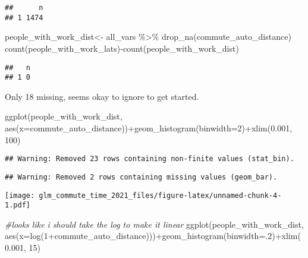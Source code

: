 \documentclass[
]{article}
\newenvironment{Shaded}{\begin{snugshade}}{\end{snugshade}}
\newcommand{\AttributeTok}[1]{\textcolor[rgb]{0.77,0.63,0.00}{#1}}
\newcommand{\CommentTok}[1]{\textcolor[rgb]{0.56,0.35,0.01}{\textit{#1}}}
\newcommand{\DecValTok}[1]{\textcolor[rgb]{0.00,0.00,0.81}{#1}}
\newcommand{\FloatTok}[1]{\textcolor[rgb]{0.00,0.00,0.81}{#1}}
\newcommand{\FunctionTok}[1]{\textcolor[rgb]{0.00,0.00,0.00}{#1}}
\newcommand{\NormalTok}[1]{#1}
\newcommand{\OtherTok}[1]{\textcolor[rgb]{0.56,0.35,0.01}{#1}}
\newcommand{\SpecialCharTok}[1]{\textcolor[rgb]{0.00,0.00,0.00}{#1}}
\begin{document}
\begin{verbatim}
##      n
## 1 1474
\end{verbatim}

\begin{Shaded}
\begin{Highlighting}[]
\NormalTok{people\_with\_work\_dist}\OtherTok{\textless{}{-}}\NormalTok{ all\_vars }\SpecialCharTok{\%\textgreater{}\%} \FunctionTok{drop\_na}\NormalTok{(commute\_auto\_distance)}
\FunctionTok{count}\NormalTok{(people\_with\_work\_lats)}\SpecialCharTok{{-}}\FunctionTok{count}\NormalTok{(people\_with\_work\_dist)}
\end{Highlighting}
\end{Shaded}

\begin{verbatim}
##   n
## 1 0
\end{verbatim}

Only 18 missing, seems okay to ignore to get started.

\begin{Shaded}
\begin{Highlighting}[]
\FunctionTok{ggplot}\NormalTok{(people\_with\_work\_dist, }\FunctionTok{aes}\NormalTok{(}\AttributeTok{x=}\NormalTok{commute\_auto\_distance))}\SpecialCharTok{+}\FunctionTok{geom\_histogram}\NormalTok{(}\AttributeTok{binwidth=}\DecValTok{2}\NormalTok{)}\SpecialCharTok{+}\FunctionTok{xlim}\NormalTok{(}\FloatTok{0.001}\NormalTok{, }\DecValTok{100}\NormalTok{)}
\end{Highlighting}
\end{Shaded}

\begin{verbatim}
## Warning: Removed 23 rows containing non-finite values (stat_bin).
\end{verbatim}

\begin{verbatim}
## Warning: Removed 2 rows containing missing values (geom_bar).
\end{verbatim}

\texttt{[image: glm\_commute\_time\_2021\_files/figure-latex/unnamed-chunk-4-1.pdf]}

\begin{Shaded}
\begin{Highlighting}[]
\CommentTok{\#looks like i should take the log to make it linear}
\FunctionTok{ggplot}\NormalTok{(people\_with\_work\_dist, }\FunctionTok{aes}\NormalTok{(}\AttributeTok{x=}\FunctionTok{log}\NormalTok{(}\DecValTok{1}\SpecialCharTok{+}\NormalTok{commute\_auto\_distance)))}\SpecialCharTok{+}\FunctionTok{geom\_histogram}\NormalTok{(}\AttributeTok{binwidth=}\NormalTok{.}\DecValTok{2}\NormalTok{)}\SpecialCharTok{+}\FunctionTok{xlim}\NormalTok{(}\FloatTok{0.001}\NormalTok{, }\DecValTok{15}\NormalTok{)}
\end{Highlighting}
\end{Shaded}
\end{document}
